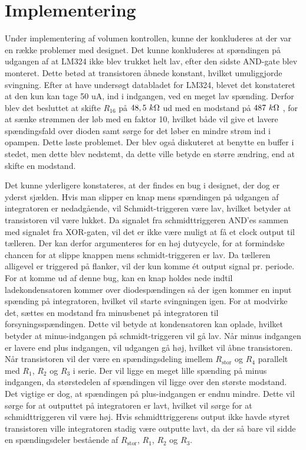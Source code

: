 \section{Implementering}
Under implementering af volumen kontrollen, kunne der konkluderes at der var en række problemer med designet. Det kunne konkluderes at spændingen på udgangen af at LM324 ikke blev trukket helt lav, efter den sidste AND-gate blev monteret. Dette betød at transistoren åbnede konstant, hvilket umuliggjorde svingning. Efter at have undersøgt databladet for LM324, blevet det konstateret at den kun kan tage 50 uA, ind i indgangen, ved en meget lav spænding. Derfor blev det besluttet at skifte $R_{16}$ på $48,5~k\ohm$ ud med en modstand på $487~k\ohm$ , for at sænke strømmen der løb med en faktor 10, hvilket både vil give et lavere spændingsfald over dioden samt sørge for det løber en mindre strøm ind i opampen. Dette løste problemet. Der blev også diskuteret at benytte en buffer i stedet, men dette blev nedstemt, da dette ville betyde en større ændring, end at skifte en modstand.

Det kunne yderligere konstateres, at der findes en bug i designet, der dog er yderst sjælden. Hvis man slipper en knap mens spændingen på udgangen af integratoren er nedadgående, vil Schmidt-triggeren være lav, hvilket betyder at transistoren vil være lukket. Da signalet fra schmidttriggeren AND'es sammen med signalet fra XOR-gaten, vil det er ikke være muligt at få et clock output til tælleren. Der kan derfor argumenteres for en høj dutycycle, for at formindske chancen for at slippe knappen mens schmidt-triggeren er lav. Da tælleren alligevel er triggered på flanker, vil der kun komme ét output signal pr. periode. For at komme ud af denne bug, kan en knap holdes nede indtil ladekondensatoren kommer over diodespændingen så der igen kommer en input spænding på integratoren, hvilket vil starte svingningen igen. 
For at modvirke det, sættes en modstand fra minusbenet på integratoren til forsyningsspændingen. Dette vil betyde at kondensatoren kan oplade, hvilket betyder at minus-indgangen på schmidt-triggeren vil gå lav. Når minus indgangen er lavere end plus indgangen, vil udgangen gå høj, hvilket vil åbne transistoren. Når transistoren vil der være en spændingsdeling imellem $R_{\mathrm{stor}}$ og $R_4$ parallelt med $R_1$, $R_2$ og $R_3$ i serie. Der vil ligge en meget lille spænding på minus indgangen, da størstedelen af spændingen vil ligge over den største modstand. Det vigtige er dog, at spændingen på plus-indgangen er endnu mindre. Dette vil sørge for at outputtet på integratoren er lavt, hvilket vil sørge for at schmidttriggeren vil være høj. Hvis schmidttriggerens output ikke havde styret transistoren ville integratoren stadig være outputte lavt, da der så bare vil sidde en spændingsdeler bestående af $R_{\mathrm{stor}}$, $R_1$, $R_2$ og $R_3$.
